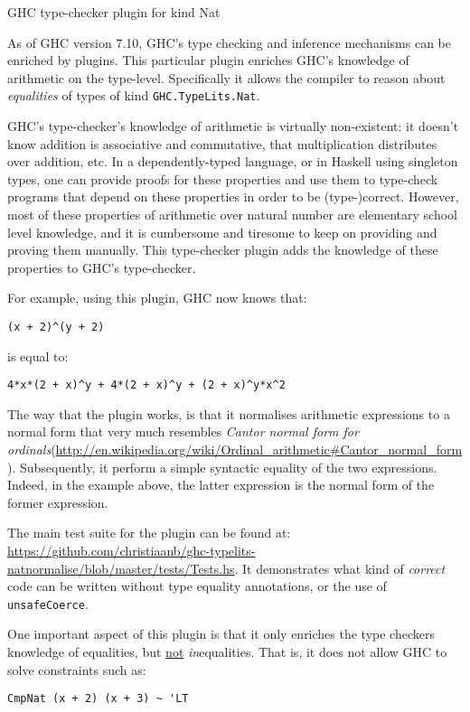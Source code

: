 \documentclass[DIV16,twocolumn,10pt]{scrreprt}
\begin{document}
\begin{hcarentry}{GHC type-checker plugin for kind Nat}
\makeheader

As of GHC version 7.10, GHC's type checking and inference mechanisms can be enriched by plugins.
This particular plugin enriches GHC's knowledge of arithmetic on the type-level.
Specifically it allows the compiler to reason about \emph{equalities} of types of kind \verb!GHC.TypeLits.Nat!.

GHC's type-checker's knowledge of arithmetic is virtually non-existent: it doesn't know addition is associative and commutative, that multiplication distributes over addition, etc.
In a dependently-typed language, or in Haskell using singleton types, one can provide proofs for these properties and use them to type-check programs that depend on these properties in order to be (type-)correct.
However, most of these properties of arithmetic over natural number are elementary school level knowledge, and it is cumbersome and tiresome to keep on providing and proving them manually.
This type-checker plugin adds the knowledge of these properties to GHC's type-checker.

For example, using this plugin, GHC now knows that:
\begin{verbatim}
(x + 2)^(y + 2)
\end{verbatim}
is equal to:
\begin{verbatim}
4*x*(2 + x)^y + 4*(2 + x)^y + (2 + x)^y*x^2
\end{verbatim}

The way that the plugin works, is that it normalises arithmetic expressions to a normal form that very much resembles \emph{Cantor normal form for ordinals}(\url{http://en.wikipedia.org/wiki/Ordinal_arithmetic#Cantor_normal_form}).
Subsequently, it perform a simple syntactic equality of the two expressions.
Indeed, in the example above, the latter expression is the normal form of the former expression.

The main test suite for the plugin can be found at: \url{https://github.com/christiaanb/ghc-typelits-natnormalise/blob/master/tests/Tests.hs}.
It demonstrates what kind of \emph{correct} code can be written without type equality annotations, or the use of \verb!unsafeCoerce!.

One important aspect of this plugin is that it only enriches the type checkers knowledge of equalities, but \underline{not} \emph{in}equalities.
That is, it does not allow GHC to solve constraints such as:
\begin{verbatim}
CmpNat (x + 2) (x + 3) ~ 'LT
\end{verbatim}


\end{hcarentry}
\end{document}
